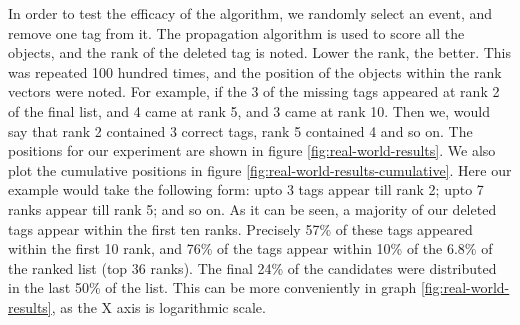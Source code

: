 In order to test the efficacy of the algorithm, we randomly select an event, and remove one tag from it. The propagation algorithm is used to score all the objects, and the rank of the deleted tag is noted. Lower the rank, the better. This was repeated 100 hundred times, and the position of the objects within the rank vectors were noted. For example, if the 3 of the missing tags appeared at rank 2 of the final list, and 4 came at rank 5, and 3 came at rank 10. Then we, would say that rank 2 contained 3 correct tags, rank 5 contained 4 and so on. The positions for our experiment are shown in figure \ref{fig:real-world-results}. We also plot the cumulative positions in figure \ref{fig:real-world-results-cumulative}. Here our example would take the following form: upto 3 tags appear till rank 2; upto 7 ranks appear till rank 5; and so on. As it can be seen, a majority of our deleted tags appear within the first ten ranks. Precisely 57\% of these tags appeared within the first 10 rank, and 76\% of the tags appear within 10\% of the 6.8\% of the ranked list (top 36 ranks). The final 24\% of the candidates were distributed in the last 50\% of the list. This can be more conveniently in graph \ref{fig:real-world-results}, as the X axis is logarithmic scale.

